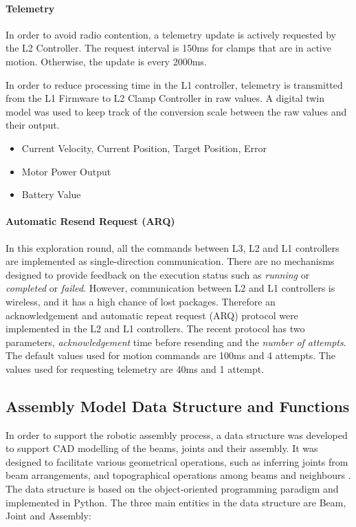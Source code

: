 \paragraph{Telemetry}

In order to avoid radio contention, a telemetry update is actively requested by the L2 Controller. The request interval is 150ms for clamps that are in active motion. Otherwise, the update is every 2000ms. 

In order to reduce processing time in the L1 controller, telemetry is transmitted from the L1 Firmware to L2 Clamp Controller in raw values. A digital twin model was used to keep track of the conversion scale between the raw values and their output.

\begin{itemize}[nosep]
    \item Current Velocity, Current Position, Target Position, Error
    \item Motor Power Output
    \item Battery Value 
\end{itemize}

\paragraph{Automatic Resend Request (ARQ)}

In this exploration round, all the commands between L3, L2 and L1 controllers are implemented as single-direction communication. There are no mechanisms designed to provide feedback on the execution status such as \textit{running} or \textit{completed} or \textit{failed}. However, communication between L2 and L1 controllers is wireless, and it has a high chance of lost packages. Therefore an acknowledgement and automatic repeat request (ARQ) protocol were implemented in the L2 and L1 controllers. The recent protocol has two parameters, \textit{acknowledgement} time before resending and the \textit{number of attempts}. The default values used for motion commands are 100ms and 4 attempts. The values used for requesting telemetry are 40ms and 1 attempt. 

\subsection{Assembly Model Data Structure and Functions}
\label{subsection:exploration-2-assembly-model-data-structure-and-functions}

In order to support the robotic assembly process, a data structure was developed to support CAD modelling of the beams, joints and their assembly. It was designed to facilitate various geometrical operations, such as inferring joints from beam arrangements, and topographical operations among beams and neighbours . The data structure is based on the object-oriented programming paradigm and implemented in Python. The three main entities in the data structure are Beam, Joint and Assembly:

